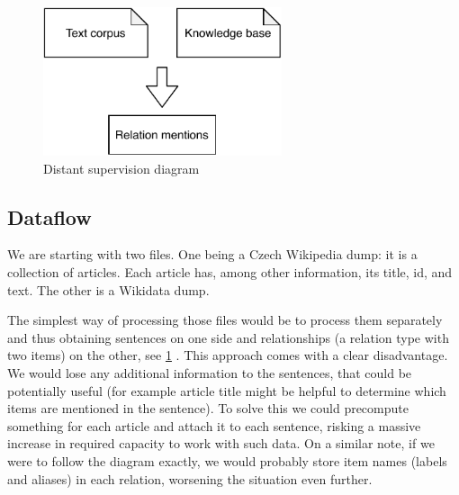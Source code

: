 \begin{figure}[h]\centering
\includegraphics[width=70mm]{./img//Diplomka diagramy-Distant supervision}
\caption{Distant supervision diagram}
\label{obr03:DSD}
\end{figure}

\subsection{Dataflow}

We are starting with two files. One being a Czech Wikipedia dump: it is a collection of articles. Each article has, among other information, its title, id, and text. The other is a Wikidata dump. 

The simplest way of processing those files would be to process them separately and thus obtaining sentences on one side and relationships (a relation type with two items) on the other, see \ref{obr03:DSD} . This approach comes with a clear disadvantage. We would lose any additional information to the sentences, that could be potentially useful (for example article title might be helpful to determine which items are mentioned in the sentence). To solve this we could precompute something for each article and attach it to each sentence, risking a massive increase in required capacity to work with such data. On a similar note, if we were to follow the diagram exactly, we would probably store item names (labels and aliases) in each relation, worsening the situation even further.

